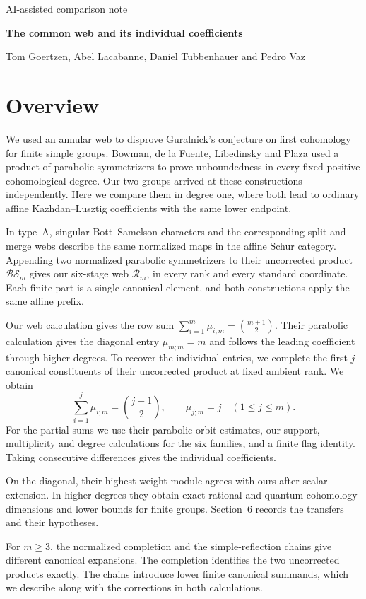 \documentclass[10pt,a4paper]{article}
\newcommand{\BS}{\mathcal{BS}}
\begin{document}
{\small AI-assisted comparison note}\par
{\LARGE\bfseries\color{navy} The common web and its individual coefficients}\par
{\large Tom Goertzen, Abel Lacabanne, Daniel Tubbenhauer and Pedro Vaz}
\section*{Overview}
We used an annular web to disprove Guralnick's conjecture on first cohomology for finite simple groups. Bowman, de la Fuente, Libedinsky and Plaza used a product of parabolic symmetrizers to prove unboundedness in every fixed positive cohomological degree. Our two groups arrived at these constructions independently. Here we compare them in degree one, where both lead to ordinary affine Kazhdan--Lusztig coefficients with the same lower endpoint.

In type~A, singular Bott--Samelson characters and the corresponding split and merge webs describe the same normalized maps in the affine Schur category. Appending two normalized parabolic symmetrizers to their uncorrected product $\BS_m$ gives our six-stage web $\mathcal R_m$, in every rank and every standard coordinate. Each finite part is a single canonical element, and both constructions apply the same affine prefix.

Our web calculation gives the row sum $\sum_{i=1}^m\mu_{i;m}=\binom{m+1}{2}$. Their parabolic calculation gives the diagonal entry $\mu_{m;m}=m$ and follows the leading coefficient through higher degrees. To recover the individual entries, we complete the first $j$ canonical constituents of their uncorrected product at fixed ambient rank. We obtain
\[
\sum_{i=1}^{j}\mu_{i;m}=\binom{j+1}{2},\qquad
\mu_{j;m}=j\quad(1\le j\le m).
\]
For the partial sums we use their parabolic orbit estimates, our support, multiplicity and degree calculations for the six families, and a finite flag identity. Taking consecutive differences gives the individual coefficients.

On the diagonal, their highest-weight module agrees with ours after scalar extension. In higher degrees they obtain exact rational and quantum cohomology dimensions and lower bounds for finite groups. Section~6 records the transfers and their hypotheses.

For $m\ge3$, the normalized completion and the simple-reflection chains give different canonical expansions. The completion identifies the two uncorrected products exactly. The chains introduce lower finite canonical summands, which we describe along with the corrections in both calculations.
\end{document}
